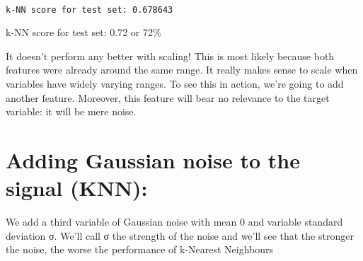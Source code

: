 \documentclass[11pt]{article}
\begin{document}
    \begin{center}
    \end{center}
    { \hspace*{\fill} \\}
    
    \begin{Verbatim}[commandchars=\\\{\}]
k-NN score for test set: 0.678643

    \end{Verbatim}

    k-NN score for test set: 0.72 or 72\%

It doesn't perform any better with scaling! This is most likely because
both features were already around the same range. It really makes sense
to scale when variables have widely varying ranges. To see this in
action, we're going to add another feature. Moreover, this feature will
bear no relevance to the target variable: it will be mere noise.

    \section{Adding Gaussian noise to the signal
(KNN):}\label{adding-gaussian-noise-to-the-signal-knn}

We add a third variable of Gaussian noise with mean 0 and variable
standard deviation σ. We'll call σ the strength of the noise and we'll
see that the stronger the noise, the worse the performance of k-Nearest
Neighbours
\end{document}
